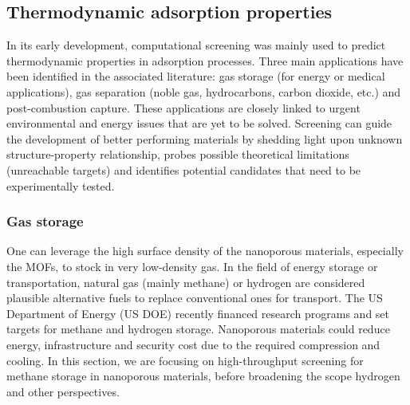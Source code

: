 \documentclass[main.tex]{subfiles}
\begin{document}
\subsection{Thermodynamic adsorption properties}

In its early development, computational screening was mainly used to predict thermodynamic properties in adsorption processes. Three main applications have been identified in the associated literature: gas storage (for energy or medical applications), gas separation (noble gas, hydrocarbons, carbon dioxide, etc.) and post-combustion  capture. These applications are closely linked to urgent environmental and energy issues that are yet to be solved. Screening can guide the development of better performing materials by shedding light upon unknown structure-property relationship, probes possible theoretical limitations (unreachable targets) and identifies potential candidates that need to be experimentally tested.

\subsubsection{Gas storage}

One can leverage the high surface density of the nanoporous materials, especially the MOFs, to stock in very low-density gas. In the field of energy storage or transportation, natural gas (mainly methane) or hydrogen are considered plausible alternative fuels to replace conventional ones for transport. The US Department of Energy (US DOE) recently financed research programs and set targets for methane and hydrogen storage. Nanoporous materials could reduce energy, infrastructure and security cost due to the required compression and cooling. In this section, we are focusing on high-throughput screening for methane storage in nanoporous materials, before broadening the scope hydrogen and other perspectives.
\end{document}
